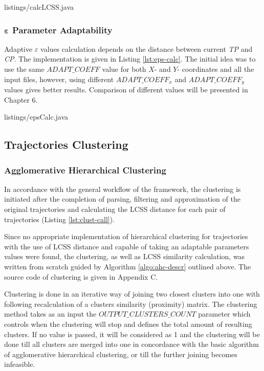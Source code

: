 {listings/calcLCSS.java}

\subsubsection{$\bm{\varepsilon}$ Parameter Adaptability}

Adaptive $\varepsilon$ values calculation depends on the distance between current \textit{TP} and \textit{CP}. The implementation is given in Listing \ref{lst:eps-calc}. The initial idea was to use the same $ADAPT\_COEFF$ value for both $X$- and $Y$- coordinates and all the input files, however, using different $ADAPT\_COEFF_x$ and $ADAPT\_COEFF_y$ values gives better results. Comparison of different values will be presented in Chapter 6.

 {listings/epsCalc.java}

\subsection{Trajectories Clustering}

\subsubsection{Agglomerative Hierarchical Clustering}

In accordance with the general workflow of the framework, the clustering is initiated after the completion of parsing, filtering and approximation of the original trajectories and calculating the LCSS distance for each pair of trajectories (Listing \ref{lst:clust-call}).



Since no appropriate implementation of hierarchical clustering for trajectories with the use of LCSS distance and capable of taking an adaptable parameters values were found, the clustering, as well as LCSS similarity calculation, was written from scratch guided by Algorithm \ref{algo:ahc-descr} outlined above. The source code of clustering is given in Appendix C.

Clustering is done in an iterative way of joining two closest clusters into one with following recalculation of a clusters similarity (proximity) matrix. The clustering method takes as an input the $OUTPUT\_CLUSTERS\_COUNT$ parameter which controls when the clustering will stop and defines the total amount of resulting clusters. If no value is passed, it will be considered as 1 and the clustering will be done till all clusters are merged into one in concordance with the basic algorithm of agglomerative hierarchical clustering, or till the further joining becomes infeasible.

